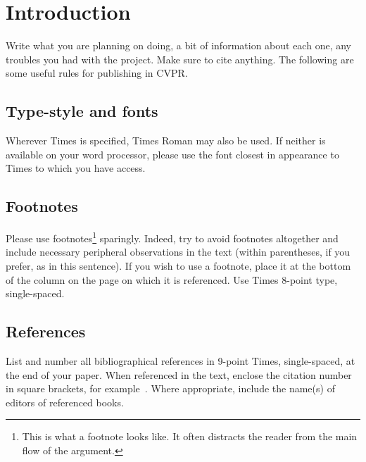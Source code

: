 \documentclass[12pt,twoside,a4paper]{article}
\title{\mytitle}
\author{\myauthors}
\date{\mydate}
\begin{document}
\maketitle


\begin{abstract}
Brief Abstract describing the project.
\end{abstract}
\vspace{1ex}
\tableofcontents
\vfill
\pagebreak

\section{Introduction}
Write what you are planning on doing, a bit of information about each one, any troubles you had with the project.  Make sure to cite anything.  The following are some useful rules for publishing in CVPR. 


\subsection{Type-style and fonts}

Wherever Times is specified, Times Roman may also be used. If neither is
available on your word processor, please use the font closest in
appearance to Times to which you have access.

\subsection{Footnotes}

Please use footnotes\footnote {This is what a footnote looks like.  It
often distracts the reader from the main flow of the argument.} sparingly.
Indeed, try to avoid footnotes altogether and include necessary peripheral
observations in
the text (within parentheses, if you prefer, as in this sentence).  If you
wish to use a footnote, place it at the bottom of the column on the page on
which it is referenced. Use Times 8-point type, single-spaced.

\subsection{References}

List and number all bibliographical references in 9-point Times,
single-spaced, at the end of your paper. When referenced in the text,
enclose the citation number in square brackets, for
example~\cite{Authors14}.  Where appropriate, include the name(s) of
editors of referenced books.
\end{document}
